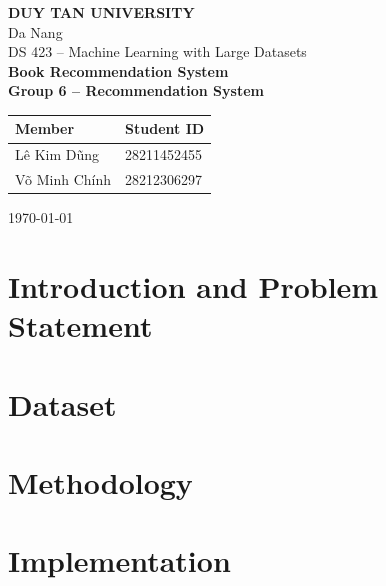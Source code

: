 \documentclass[12pt]{article}
\begin{document}
\begin{titlepage}
\centering
\vspace*{1cm}
{\Large \textbf{DUY TAN UNIVERSITY}}\\[0.3cm]
{\large Da Nang}\\[1.5cm]
{\large DS 423 -- Machine Learning with Large Datasets}\\[2.5cm]
{\huge \textbf{Book Recommendation System}}\\[1cm]
{\large \textbf{Group 6 -- Recommendation System}}\\[1.5cm]
\begin{tabular}{ll}
\textbf{Member} & \textbf{Student ID} \\
\hline
Lê Kim Dũng & 28211452455 \\
Võ Minh Chính & 28212306297 \\
\end{tabular}
\vfill
{\large \today}
\end{titlepage}

\tableofcontents
\newpage

\begin{abstract}
\end{abstract}

\section{Introduction and Problem Statement}

\section{Dataset}

\section{Methodology}

\section{Implementation}
\end{document}
